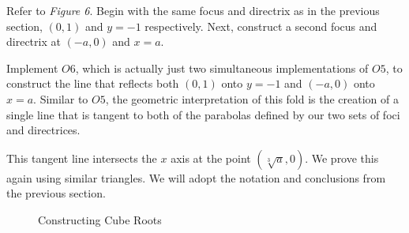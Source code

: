 \documentclass[]{article}
\begin{document}
  Refer to \emph{Figure 6}. Begin with the same focus and directrix as in the previous section, $(0,1)$ and $y=-1$ respectively. Next, construct a second focus and directrix at $(-a,0)$ and $x=a$.
  
  Implement $O6$, which is actually just two simultaneous implementations of $O5$, to construct the line that reflects both $(0,1)$ onto $y=-1$ and $(-a,0)$ onto $x=a$. Similar to $O5$, the geometric interpretation of this fold is the creation of a single line that is tangent to both of the parabolas defined by our two sets of foci and directrices.
  
  This tangent line intersects the $x$ axis at the point $(\sqrt[3]{a},0)$. We prove this again using similar triangles. We will adopt the notation and conclusions from the previous section.
  
     \begin{figure}[t]
     	\centering
     	\caption{Constructing Cube Roots} \label{figure 6}
     \end{figure}
     
\end{document}
